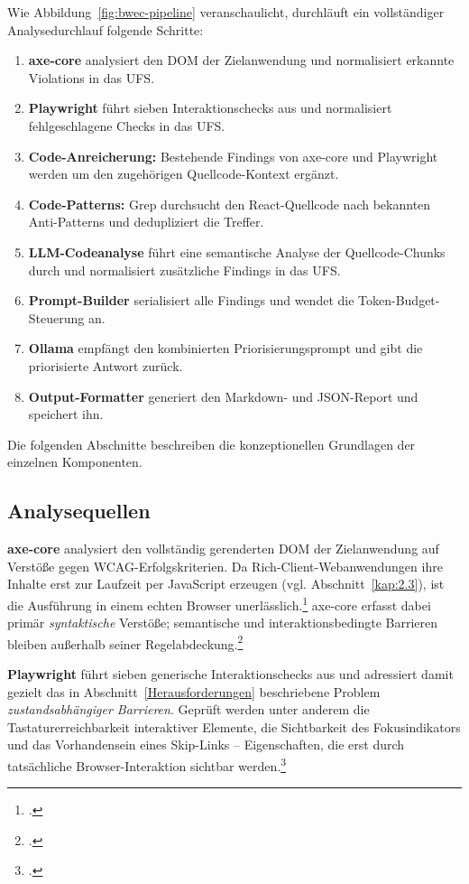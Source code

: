 Wie Abbildung~\ref{fig:bwec-pipeline} veranschaulicht, durchläuft ein vollständiger Analysedurchlauf folgende Schritte:
\begin{enumerate}
  \item \textbf{axe-core} analysiert den \ac{DOM} der Zielanwendung und normalisiert erkannte Violations in das \ac{UFS}.
  \item \textbf{Playwright} führt sieben Interaktionschecks aus und normalisiert fehlgeschlagene Checks in das \ac{UFS}.
  \item \textbf{Code-Anreicherung:} Bestehende Findings von axe-core und Playwright werden um den zugehörigen Quellcode-Kontext ergänzt.
  \item \textbf{Code-Patterns:} Grep durchsucht den React-Quellcode nach bekannten Anti-Patterns und dedupliziert die Treffer.
  \item \textbf{\ac{LLM}-Codeanalyse} führt eine semantische Analyse der Quellcode-Chunks durch und normalisiert zusätzliche Findings in das \ac{UFS}.
  \item \textbf{Prompt-Builder} serialisiert alle Findings und wendet die Token-Budget-Steuerung an.
  \item \textbf{Ollama} empfängt den kombinierten Priorisierungsprompt und gibt die priorisierte Antwort zurück.
  \item \textbf{Output-Formatter} generiert den Markdown- und \acs{JSON}-Report und speichert ihn.
\end{enumerate}
Die folgenden Abschnitte beschreiben die konzeptionellen Grundlagen der einzelnen Komponenten.

\subsection{Analysequellen}

\textbf{axe-core} analysiert den vollständig gerenderten \ac{DOM} der Zielanwendung auf Verstöße gegen \ac{WCAG}-Erfolgskriterien. Da Rich-Client-Webanwendungen ihre Inhalte erst zur Laufzeit per JavaScript erzeugen (vgl. Abschnitt~\ref{kap:2.3}), ist die Ausführung in einem echten Browser unerlässlich.\footcite[Vgl.][]{fathallah_accessguru_2025} axe-core erfasst dabei primär \textit{syntaktische} Verstöße; semantische und interaktions\-bedingte Barrieren bleiben außerhalb seiner Regelabdeckung.\footcite[Vgl.][]{kodithuwakku_assessing_2025}

\textbf{Playwright} führt sieben generische Interaktionschecks aus und adressiert damit gezielt das in Abschnitt~\ref{Herausforderungen} beschriebene Problem \textit{zustandsabhängiger Barrieren}. Geprüft werden unter anderem die Tastaturerreichbarkeit interaktiver Elemente, die Sichtbarkeit des Fokusindikators und das Vorhandensein eines Skip-Links -- Eigenschaften, die erst durch tatsächliche Browser-Interaktion sichtbar werden.\footcite[Vgl.][]{huang_access_2024}

